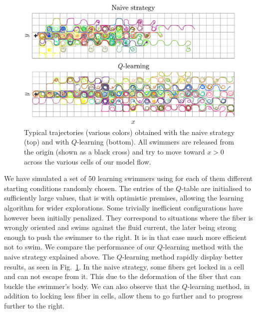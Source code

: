 \documentclass[aps,prl,preprint,groupedaddress]{revtex4-2}
\begin{document}
\begin{figure}[ht]
  \centerline{\includegraphics[width=\columnwidth]{compare_traj}}
  \caption{\label{fig:compare_traj} Typical trajectories (various colors) obtained with the naive strategy (top) and with $Q$-learning (bottom). All swimmers are released from the origin (shown as a black cross) and try to move toward $x>0$ across the various cells of our model flow.}
\end{figure}
We have simulated a set of 50 learning swimmers using for each of them different starting conditions randomly chosen. The entries of the $Q$-table are initialised to sufficiently large values, that is with optimistic premises, allowing the learning algorithm for wider explorations. Some trivially inefficient configurations have however been initially penalized. They correspond to situations where the fiber is wrongly oriented and swims against the fluid current, the later being strong enough to push the swimmer to the right. It is in that case much more efficient not to swim. We compare the performance of our $Q$-learning method with the naive strategy explained above. The $Q$-learning method rapidly display better results, as seen in Fig.~\ref{fig:compare_traj}. In the naive strategy, some fibers get locked in a cell and can not escape from it. This due to the deformation of the fiber that can buckle the swimmer's body. We can also observe that the $Q$-learning method, in addition to locking less fiber in cells, allow them to go further and to progress further to the right.
\end{document}
